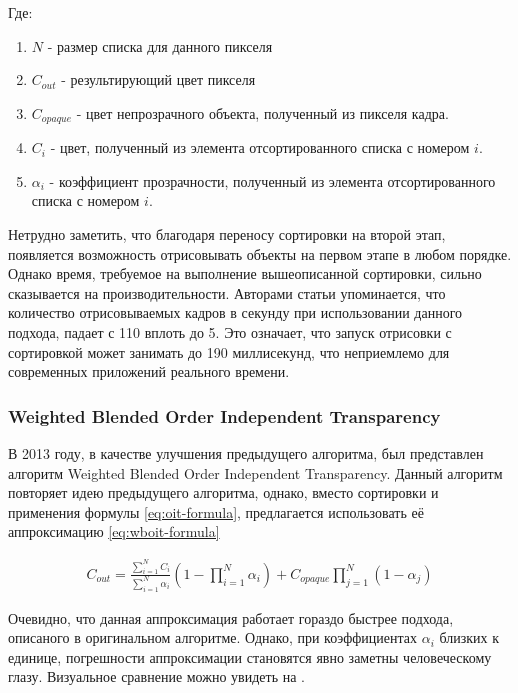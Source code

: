 			Где:
			\begin{enumerate}[1.]
				\item $N$ - размер списка для данного пикселя
				\item $C_{out}$ - результирующий цвет пикселя
				\item $C_{opaque}$ - цвет непрозрачного объекта, полученный из пикселя кадра.
				\item $C_{i}$ - цвет, полученный из элемента отсортированного списка с номером $i$.
				\item $\alpha_i$ - коэффициент прозрачности, полученный из элемента отсортированного списка с номером $i$.
			\end{enumerate}			
			
			Нетрудно заметить, что благодаря переносу сортировки на второй этап, появляется возможность отрисовывать объекты на первом этапе в любом порядке. Однако время, требуемое на выполнение вышеописанной сортировки, сильно сказывается на производительности. Авторами статьи упоминается, что количество отрисовываемых кадров в секунду при использовании данного подхода, падает с 110 вплоть до 5. Это означает, что запуск отрисовки с сортировкой может занимать до 190 миллисекунд, что неприемлемо для современных приложений реального времени.
		\subsubsection{Weighted Blended Order Independent Transparency} \label{ch3:render_pass:transparents:wboit}
			В 2013 году, в качестве улучшения предыдущего алгоритма, был представлен алгоритм Weighted Blended Order Independent Transparency\cite{mcguire2013weighted}. Данный алгоритм повторяет идею предыдущего алгоритма, однако, вместо сортировки и применения формулы \ref{eq:oit-formula}, предлагается использовать её аппроксимацию \ref{eq:wboit-formula}
					 
			\begin{equation}
				\label{eq:wboit-formula}
				\begin{multlined}	 
					C_{out} = \frac{\sum_{i=1}^{N}C_i}{\sum_{i=1}^{N}\alpha_i}(1 - \prod_{i=1}^{N}\alpha_i) + 
					C_{opaque}\prod _{j=1}^{N}(1 - \alpha_j)   
				\end{multlined}
			\end{equation}
			
			Очевидно, что данная аппроксимация работает гораздо быстрее подхода, описаного в оригинальном алгоритме. Однако, при коэффициентах $\alpha_i$ близких к единице, погрешности аппроксимации становятся явно заметны человеческому глазу. Визуальное сравнение можно увидеть на .
			
